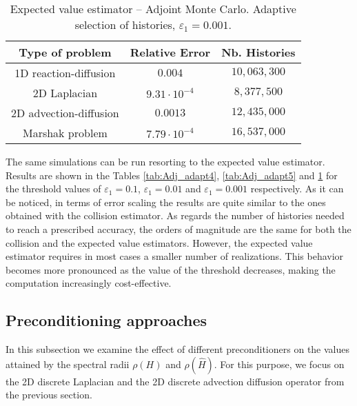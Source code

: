 \documentclass[final,leqno,onefignum,onetabnum]{siamltex1213}
\begin{document}
\begin{table}[!t]
\centering
\begin{tabular}{|c|c|c|}
\hline
\textbf{Type of problem} & \textbf{Relative Error} &\textbf{Nb. Histories}\\
\hline
1D reaction-diffusion & $0.004$ & $10,063,300$\\
\hline
2D Laplacian & $ 9.31 \cdot 10^{-4} $ & $ 8,377,500 $\\
\hline
2D advection-diffusion & $ 0.0013 $  & $ 12,435,000 $\\
\hline
Marshak problem & $7.79 \cdot 10^{-4}$ & $16,537,000$\\
\hline
\end{tabular}
\caption{Expected value estimator -- Adjoint Monte Carlo. Adaptive selection of histories,
$\varepsilon_1=0.001.$}
\label{tab:Adj_adapt6}
\end{table}

The same simulations can be run resorting to the expected value
estimator. Results are shown in the Tables \ref{tab:Adj_adapt4},
\ref{tab:Adj_adapt5} and \ref{tab:Adj_adapt6} for the threshold values of
$\varepsilon_1=0.1$, $\varepsilon_1=0.01$ and $\varepsilon_1=0.001$
respectively. As it can be noticed, in terms of error scaling the results are
quite similar to the ones obtained with the collision estimator. As regards
the number of histories needed to reach a prescribed accuracy, the
orders of magnitude are the same for both the collision and the
expected value estimators. However, the expected value estimator requires  
in most cases a smaller number of realizations. This behavior becomes more
pronounced as the value of
the threshold decreases, making the computation increasingly cost-effective.

\subsection{Preconditioning approaches}

In this subsection we examine the effect of different preconditioners
on the values attained by the spectral radii $\rho(H)$ and $\rho(\hat{H})$.
For this purpose, we focus on the 2D discrete Laplacian and the 
2D discrete advection
diffusion operator from the previous section. 
\end{document}
